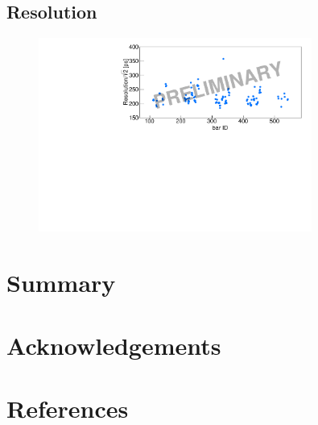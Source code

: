 \documentclass[review]{elsarticle}
\begin{document}
\subsection{Resolution}

\begin{figure}[h!]
\centering
\includegraphics[width=0.8\textwidth]{figures/calibrations/resolutions.pdf}
\caption{}
\end{figure}




\section{Summary}


\section{Acknowledgements}


\section*{References}

\end{document}

